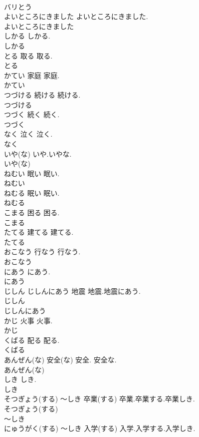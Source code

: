 \documentclass[8pt]{extreport}
\begin{document}
\begin{CJK}{UTF8}{min}
\\	バリとう
\\	よいところにきました		よいところにきました.	
\\	よいところにきました
\\	しかる		しかる.	
\\	しかる
\\	とる	取る	取る.	
\\	とる
\\	かてい	家庭	家庭.	
\\	かてい
\\	つづける	続ける	続ける.	
\\	つづける
\\	つづく	続く	続く.	
\\	つづく
\\	なく	泣く	泣く.	
\\	なく
\\	いや(な)		いや.いやな.	
\\	いや(な)
\\	ねむい	眠い	眠い.	
\\	ねむい
\\	ねむる	眠い	眠い.	
\\	ねむる
\\	こまる	困る	困る.	
\\	こまる
\\	たてる	建てる	建てる.	
\\	たてる
\\	おこなう	行なう	行なう.	
\\	おこなう
\\	にあう		にあう.	
\\	にあう
\\	じしん じしんにあう	地震	地震.地震にあう.	
\\	じしん
\\	じしんにあう
\\	かじ	火事	火事.	
\\	かじ
\\	くばる	配る	配る.	
\\	くばる
\\	あんぜん(な)	安全(な)	安全. 安全な.	
\\	あんぜん(な)
\\	しき		しき.	
\\	しき
\\	そつぎょう(する) ～しき	卒業(する)	卒業.卒業する.卒業しき.	
\\	そつぎょう(する)
\\	～しき
\\	にゅうがく(する) ～しき	入学(する)	入学.入学する.入学しき.	

\end{CJK}
\end{document}
